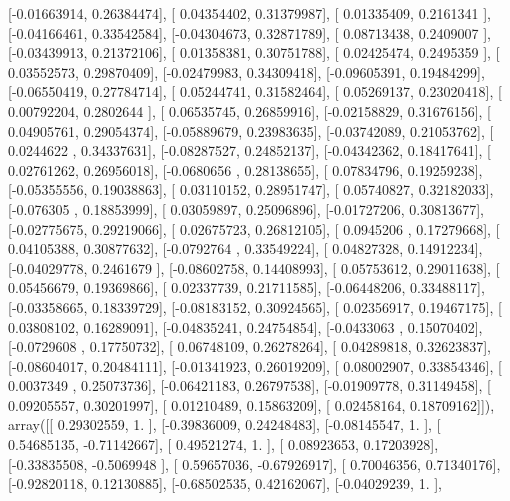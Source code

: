 \documentclass{article}
\begin{document}
       [-0.01663914,  0.26384474],
       [ 0.04354402,  0.31379987],
       [ 0.01335409,  0.2161341 ],
       [-0.04166461,  0.33542584],
       [-0.04304673,  0.32871789],
       [ 0.08713438,  0.2409007 ],
       [-0.03439913,  0.21372106],
       [ 0.01358381,  0.30751788],
       [ 0.02425474,  0.2495359 ],
       [ 0.03552573,  0.29870409],
       [-0.02479983,  0.34309418],
       [-0.09605391,  0.19484299],
       [-0.06550419,  0.27784714],
       [ 0.05244741,  0.31582464],
       [ 0.05269137,  0.23020418],
       [ 0.00792204,  0.2802644 ],
       [ 0.06535745,  0.26859916],
       [-0.02158829,  0.31676156],
       [ 0.04905761,  0.29054374],
       [-0.05889679,  0.23983635],
       [-0.03742089,  0.21053762],
       [ 0.0244622 ,  0.34337631],
       [-0.08287527,  0.24852137],
       [-0.04342362,  0.18417641],
       [ 0.02761262,  0.26956018],
       [-0.0680656 ,  0.28138655],
       [ 0.07834796,  0.19259238],
       [-0.05355556,  0.19038863],
       [ 0.03110152,  0.28951747],
       [ 0.05740827,  0.32182033],
       [-0.076305  ,  0.18853999],
       [ 0.03059897,  0.25096896],
       [-0.01727206,  0.30813677],
       [-0.02775675,  0.29219066],
       [ 0.02675723,  0.26812105],
       [ 0.0945206 ,  0.17279668],
       [ 0.04105388,  0.30877632],
       [-0.0792764 ,  0.33549224],
       [ 0.04827328,  0.14912234],
       [-0.04029778,  0.2461679 ],
       [-0.08602758,  0.14408993],
       [ 0.05753612,  0.29011638],
       [ 0.05456679,  0.19369866],
       [ 0.02337739,  0.21711585],
       [-0.06448206,  0.33488117],
       [-0.03358665,  0.18339729],
       [-0.08183152,  0.30924565],
       [ 0.02356917,  0.19467175],
       [ 0.03808102,  0.16289091],
       [-0.04835241,  0.24754854],
       [-0.0433063 ,  0.15070402],
       [-0.0729608 ,  0.17750732],
       [ 0.06748109,  0.26278264],
       [ 0.04289818,  0.32623837],
       [-0.08604017,  0.20484111],
       [-0.01341923,  0.26019209],
       [ 0.08002907,  0.33854346],
       [ 0.0037349 ,  0.25073736],
       [-0.06421183,  0.26797538],
       [-0.01909778,  0.31149458],
       [ 0.09205557,  0.30201997],
       [ 0.01210489,  0.15863209],
       [ 0.02458164,  0.18709162]]), array([[ 0.29302559,  1.        ],
       [-0.39836009,  0.24248483],
       [-0.08145547,  1.        ],
       [ 0.54685135, -0.71142667],
       [ 0.49521274,  1.        ],
       [ 0.08923653,  0.17203928],
       [-0.33835508, -0.5069948 ],
       [ 0.59657036, -0.67926917],
       [ 0.70046356,  0.71340176],
       [-0.92820118,  0.12130885],
       [-0.68502535,  0.42162067],
       [-0.04029239,  1.        ],
\end{document}
